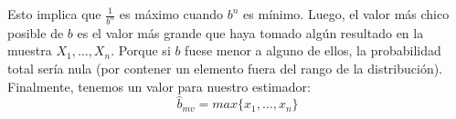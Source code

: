 Esto implica que $\frac{1}{b^n}$ es máximo cuando $b^n$ es mínimo. Luego, el valor más chico posible de $b$ es el valor más grande que haya tomado algún resultado en la muestra $X_{1}, \dots, X_{n}$. Porque si $b$ fuese menor a alguno de ellos, la probabilidad total sería nula (por contener un elemento fuera del rango de la distribución). Finalmente, tenemos un valor para nuestro estimador:
$$\hat{b}_{mv} = max\{x_{1}, \dots, x_{n}\}$$